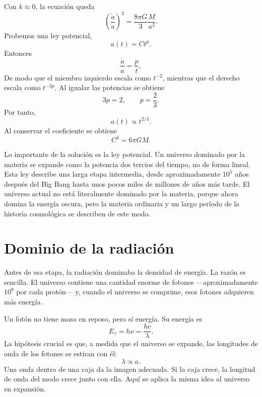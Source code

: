 Con \(k\approx 0\), la ecuación queda
\begin{equation}
\left(\frac{\dot a}{a}\right)^2=\frac{8\pi G}{3}\frac{M}{a^3}.
\end{equation}
Probemos una ley potencial,
\begin{equation}
a(t)=Ct^p.
\end{equation}
Entonces
\begin{equation}
\frac{\dot a}{a}=\frac{p}{t},
\end{equation}
De modo que el miembro izquierdo escala como \(t^{-2}\), mientras que el derecho escala como \(t^{-3p}\). Al igualar las potencias se obtiene
\begin{equation}
3p=2,
\qquad
p=\frac{2}{3}.
\end{equation}
Por tanto,
\begin{equation}
a(t)\propto t^{2/3}.
\end{equation}
Al conservar el coeficiente se obtiene
\begin{equation}
C^3=6\pi G M.
\end{equation}

Lo importante de la solución es la ley potencial. Un universo dominado por la materia se expande como la potencia dos tercios del tiempo, no de forma lineal. Esta ley describe una larga etapa intermedia, desde aproximadamente \(10^5\) años después del Big Bang hasta unos pocos miles de millones de años más tarde. El universo actual no está literalmente dominado por la materia, porque ahora domina la energía oscura, pero la materia ordinaria y un largo período de la historia cosmológica se describen de este modo.

\section{Dominio de la radiación}

Antes de esa etapa, la radiación dominaba la densidad de energía. La razón es sencilla. El universo contiene una cantidad enorme de fotones —aproximadamente \(10^9\) por cada protón— y, cuando el universo se comprime, esos fotones adquieren más energía.

Un fotón no tiene masa en reposo, pero sí energía. Su energía es
\begin{equation}
E_\gamma=h\nu=\frac{hc}{\lambda}.
\end{equation}
La hipótesis crucial es que, a medida que el universo se expande, las longitudes de onda de los fotones se estiran con él:
\begin{equation}
\lambda\propto a.
\end{equation}
Una onda dentro de una caja da la imagen adecuada. Si la caja crece, la longitud de onda del modo crece junto con ella. Aquí se aplica la misma idea al universo en expansión.

